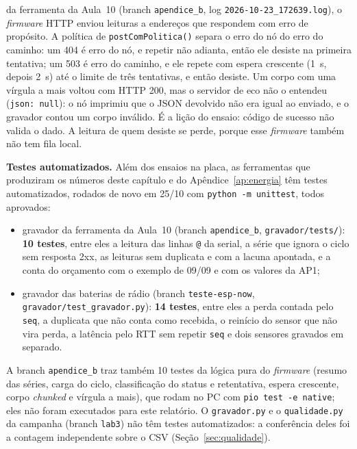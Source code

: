 \begin{itemize}
    da ferramenta da Aula~10 (branch \texttt{apendice\_b}, log
    \texttt{2026-10-23\_172639.log}), o \emph{firmware} HTTP enviou
    leituras a endereços que respondem com erro de propósito. A política
    de \texttt{postComPolitica()} separa o erro do nó do erro do caminho:
    um 404 é erro do nó, e repetir não adianta, então ele desiste na
    primeira tentativa; um 503 é erro do caminho, e ele repete com espera
    crescente (\SI{1}{\second}, depois \SI{2}{\second}) até o limite de
    três tentativas, e então desiste. Um corpo com uma vírgula a mais
    voltou com HTTP 200, mas o servidor de eco não o entendeu
    (\texttt{\textquotedbl json\textquotedbl:\,null}): o nó imprimiu que o JSON devolvido não era
    igual ao enviado, e o gravador contou um corpo inválido. É a lição do
    ensaio: código de sucesso não valida o dado. A leitura de quem desiste
    se perde, porque esse \emph{firmware} também não tem fila local.
\end{itemize}

\noindent\textbf{Testes automatizados.} Além dos ensaios na placa, as
ferramentas que produziram os números deste capítulo e do
Apêndice~\ref{ap:energia} têm testes automatizados, rodados de novo em
25/10 com \texttt{python -m unittest}, todos aprovados:

\begin{itemize}
  \item gravador da ferramenta da Aula~10 (branch \texttt{apendice\_b},
    \texttt{gravador/tests/}): \textbf{10 testes}, entre eles a leitura
    das linhas \texttt{@} da serial, a série que ignora o ciclo sem
    resposta 2xx, as leituras sem duplicata e com a lacuna apontada, e a
    conta do orçamento com o exemplo de 09/09 e com os valores da AP1;
  \item gravador das baterias de rádio (branch \texttt{teste-esp-now},
    \texttt{gravador/test\_gravador.py}): \textbf{14 testes}, entre eles
    a perda contada pelo \texttt{seq}, a duplicata que não conta como
    recebida, o reinício do sensor que não vira perda, a latência pelo
    RTT sem repetir \texttt{seq} e dois sensores gravados em separado.
\end{itemize}

\noindent A branch \texttt{apendice\_b} traz também 10 testes da
lógica pura do \emph{firmware} (resumo das séries, carga do ciclo,
classificação do status e retentativa, espera crescente, corpo
\emph{chunked} e vírgula a mais), que rodam no PC com
\texttt{pio test -e native}; eles não foram executados para este
relatório. O \texttt{gravador.py} e o \texttt{qualidade.py} da
campanha (branch \texttt{lab3}) não têm testes automatizados: a
conferência deles foi a contagem independente sobre o CSV
(Seção~\ref{sec:qualidade}).

